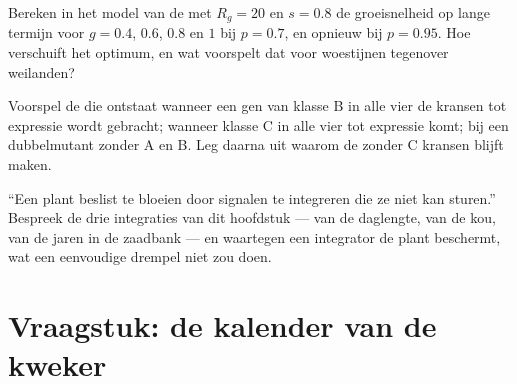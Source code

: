 \begin{exercise}[$\star\star\star$]\label{exo:b2:plant-flowering:10}
Bereken in het model van de  met $R_g = 20$ en $s = 0.8$ de
groeisnelheid op lange termijn voor $g = 0.4$, $0.6$, $0.8$ en $1$ bij
$p = 0.7$, en opnieuw bij $p = 0.95$. Hoe verschuift het optimum, en wat
voorspelt dat voor woestijnen tegenover weilanden?
\end{exercise}

\begin{exercise}[$\star\star\star$]\label{exo:b2:plant-flowering:11}
Voorspel de  die ontstaat wanneer een gen van klasse B in alle vier de
kransen tot expressie wordt gebracht; wanneer klasse C in alle vier tot
expressie komt; bij een dubbelmutant zonder A en B. Leg daarna uit waarom de
 zonder C kransen blijft maken.
\end{exercise}

\begin{exercise}[$\star\star\star$]\label{exo:b2:plant-flowering:12}
``Een plant beslist te bloeien door signalen te integreren die ze niet kan
sturen.'' Bespreek de drie integraties van dit hoofdstuk --- van de
daglengte, van de kou, van de jaren in de zaadbank --- en waartegen een
integrator de plant beschermt, wat een eenvoudige drempel niet zou doen.
\end{exercise}

\section{Vraagstuk: de kalender van de kweker}

